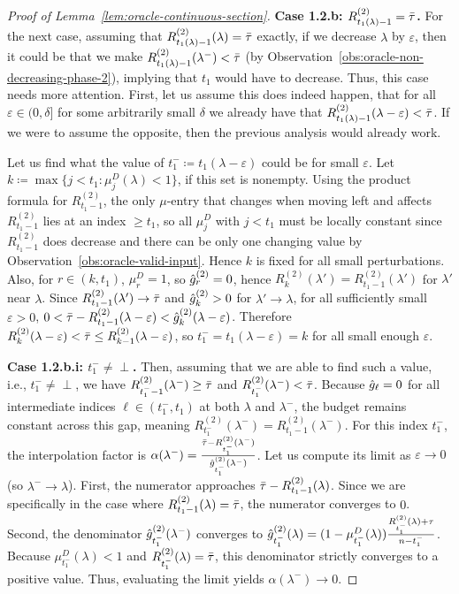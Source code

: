 \begin{proof}[Proof of Lemma~\ref{lem:oracle-continuous-section}]
    \smallskip
    \noindent\textbf{Case 1.2.b: $R_{t_1(\lambda)-1}^{(2)}=\bar\tau$.}
    For the next case, assuming that $R_{t_1(\lambda)-1}^{(2)}(\lambda)=\bar\tau$ exactly, if we decrease $\lambda$ by $\varepsilon$, then it could be that we make $R_{t_1(\lambda)-1}^{(2)}(\lambda^-)<\bar\tau$ (by Observation~\ref{obs:oracle-non-decreasing-phase-2}), implying that $t_1$ would have to decrease. Thus, this case needs more attention. 
    First, let us assume this does indeed happen, that for all $\varepsilon \in (0,\delta]$ for some arbitrarily small $\delta$ we already have that $R_{t_1(\lambda)-1}^{(2)}(\lambda-\varepsilon)<\bar\tau$. If we were to assume the opposite, then the previous analysis would already work.

    Let us find what the value of $t_1^-\coloneqq t_1(\lambda-\varepsilon)$ could be for small $\varepsilon$. Let $k\coloneqq \max\{j<t_1:\mu_j^D(\lambda)<1\}$, if this set is nonempty. Using the product formula for $R_{t_1-1}^{(2)}$, the only $\mu$-entry that changes when moving left and affects $R_{t_1-1}^{(2)}$ lies at an index $\geq t_1$, so all $\mu_j^D$ with $j<t_1$ must be locally constant since $R_{t_1-1}^{(2)}$ does decrease and there can be only one changing value by Observation~\ref{obs:oracle-valid-input}. Hence $k$ is fixed for all small perturbations. Also, for $r\in(k,t_1)$, $\mu_r^D=1$, so $\hat{g}_r^{(2)}=0$, hence $R_k^{(2)}(\lambda')=R_{t_1-1}^{(2)}(\lambda')$ for $\lambda'$ near $\lambda$. Since $R_{t_1-1}^{(2)}(\lambda')\to {\bar\tau}$ and $\hat{g}_k^{(2)}>0$ for $\lambda'\to\lambda$, for all sufficiently small $\varepsilon>0$, $0<{\bar\tau}-R_{t_1-1}^{(2)}(\lambda-\varepsilon)<\hat{g}_k^{(2)}(\lambda-\varepsilon)$. Therefore $R_k^{(2)}(\lambda-\varepsilon)<{\bar\tau}\leq R_{k-1}^{(2)}(\lambda-\varepsilon)$, so $t_1^-=t_1(\lambda-\varepsilon)=k$ for all small enough $\varepsilon$.
    
    \smallskip
    \noindent\textbf{Case 1.2.b.i: $t_1^-\neq \perp$.}
    Then, assuming that we are able to find such a value, i.e., $t_1^-\neq \perp$, we have $R_{t_1^- -1}^{(2)}(\lambda^-)\geq \bar\tau$ and $R_{t_1^-}^{(2)}(\lambda^-) < \bar\tau$. Because $\hat{g}_\ell = 0$ for all intermediate indices $\ell \in (t_1^-, t_1)$ at both $\lambda$ and $\lambda^-$, the budget remains constant across this gap, meaning $R_{t_1^-}^{(2)}(\lambda^-) = R_{t_1-1}^{(2)}(\lambda^-)$. 
    For this index $t_1^-$, the interpolation factor is $\alpha(\lambda^-) = \frac{\bar\tau - R_{t_1^-}^{(2)}(\lambda^-)}{\hat{g}_{t_1^-}^{(2)}(\lambda^-)}$. Let us compute its limit as $\varepsilon \to 0$ (so $\lambda^- \to \lambda$).
    First, the numerator approaches $\bar\tau - R_{t_1-1}^{(2)}(\lambda)$. Since we are specifically in the case where $R_{t_1-1}^{(2)}(\lambda) = \bar\tau$, the numerator converges to $0$. 
    Second, the denominator $\hat{g}_{t_1^-}^{(2)}(\lambda^-)$ converges to $\hat{g}_{t_1^-}^{(2)}(\lambda) = (1 - \mu_{t_1^-}^D(\lambda)) \frac{R_{t_1^-}^{(2)}(\lambda) + \tau}{n - t_1^-}$. Because $\mu_{t_1^-}^D(\lambda) < 1$ and $R_{t_1^-}^{(2)}(\lambda) = \bar\tau$, this denominator strictly converges to a positive value. 
    Thus, evaluating the limit yields $\alpha(\lambda^-) \to 0$.


\end{proof}
